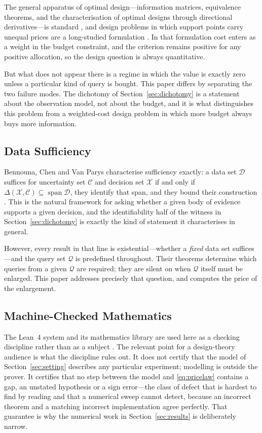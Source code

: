 \documentclass[conference]{IEEEtran}
\theoremstyle{definition}
\begin{document}
The general apparatus of optimal design---information matrices, equivalence theorems, and
the characterisation of optimal designs through directional derivatives---is standard
\cite{pukelsheim2006,silvey1980}, and design problems in which support points carry unequal
prices are a long-studied formulation \cite{stigler1971}. In that formulation cost enters as
a weight in the budget constraint, and the criterion remains positive for any positive
allocation, so the design question is always quantitative.

But what does not appear there is a regime in which the value is exactly zero unless a
particular kind of query is bought. This paper differs by separating the two failure modes.
The dichotomy of Section~\ref{sec:dichotomy} is a statement about the observation model,
not about the budget, and it is what distinguishes this problem from a weighted-cost design
problem in which more budget always buys more information.

\subsection{Data Sufficiency}

Bennouna, Chen and Van Parys characterise sufficiency exactly: a data set $\mathcal{D}$
suffices for uncertainty set $\mathcal{C}$ and decision set $\mathcal{X}$ if and only if
$\Delta(\mathcal{X},\mathcal{C})\subseteq\operatorname{span}\mathcal{D}$, they identify that
span, and they bound their construction \cite{bennouna2025}. This is the natural framework
for asking whether a given body of evidence supports a given decision, and the
identifiability half of the witness in Section~\ref{sec:dichotomy} is exactly the kind of
statement it characterises in general.

However, every result in that line is existential---whether a \emph{fixed} data set
suffices---and the query set $\mathcal{Q}$ is predefined throughout. Their theorems
determine which queries from a given $\mathcal{Q}$ are required; they are silent on when
$\mathcal{Q}$ itself must be enlarged. This paper addresses precisely that question, and
computes the price of the enlargement.

\subsection{Machine-Checked Mathematics}

The Lean~4 system and its mathematics library are used here as a checking discipline rather
than as a subject \cite{demoura2021,mathlib2020}. The relevant point for a design-theory
audience is what the discipline rules out. It does not certify that the model of
Section~\ref{sec:setting} describes any particular experiment; modelling is outside the
prover. It certifies that no step between the model and \eqref{eq:pricelaw} contains a gap,
an unstated hypothesis or a sign error---the class of defect that is hardest to find by
reading and that a numerical sweep cannot detect, because an incorrect theorem and a
matching incorrect implementation agree perfectly. That guarantee is why the numerical work
in Section~\ref{sec:results} is deliberately narrow.
\end{document}
